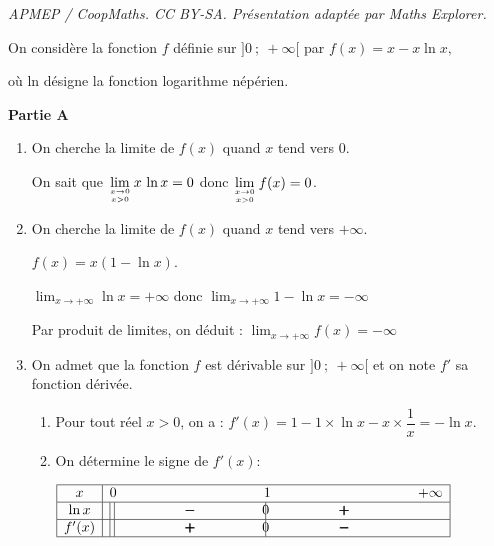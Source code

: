 \documentclass[10pt]{article}
\providecommand{\ds}{\displaystyle}
\begin{document}
\noindent\textit{APMEP / CoopMaths. CC BY-SA. Présentation adaptée par Maths Explorer.}\par\medskip
\medskip

On considère la fonction $f$  définie sur $]0~;~+\infty[$ par 
$f(x) = x - x \ln x,$

où ln désigne la fonction logarithme népérien.

\bigskip

\textbf{Partie A}

\medskip

\begin{enumerate}
\item On cherche la limite de $f(x)$ quand $x$ tend vers $0$.

On sait que $\ds\lim_{x\to 0 \atop x>0} x\,\ln x=0$ donc $\ds\lim_{x\to 0 \atop x>0} f(x) = 0$.

\item On cherche la limite de $f(x)$ quand $x$ tend vers $+\infty$.

$f(x)=x\left (1 - \ln x\right )$.

$\ds\lim_{x\to +\infty} \ln x = +\infty$ donc $\ds\lim_{x\to +\infty} 1- \ln x = -\infty$

Par produit de limites, on déduit : $\ds\lim_{x\to +\infty} f(x) = -\infty$

\item On admet que la fonction $f$ est dérivable sur $]0~;~+\infty[$ et on note $f'$ sa fonction dérivée.
	\begin{enumerate}
		\item Pour tout réel $x > 0$, on a :
		$f'(x) = 1 - 1\times \ln x - x\times \dfrac{1}{x} = - \ln x$.
		
		\item 
		
On détermine le signe de $f'(x)$:

\begin{center}
{\renewcommand{\arraystretch}{1.5}
\def\esp{\hspace*{3cm}}
$\begin{array}{|c |l *{4}{c} |} 
\hline
x  & 0 & \esp & 1 & \esp  & +\infty \\
\hline
\ln x &\vline\;\vline  & \pmb{-} &  \vline\hspace{-2.7pt}{0} & \pmb{+} &   \\
\hline
f'(x) &\vline\;\vline  & \pmb{+} &  \vline\hspace{-2.7pt}{0} & \pmb{-} &   \\
\hline
\end{array}$
}
\end{center}
		

\end{enumerate}
\end{enumerate}
\end{document}

